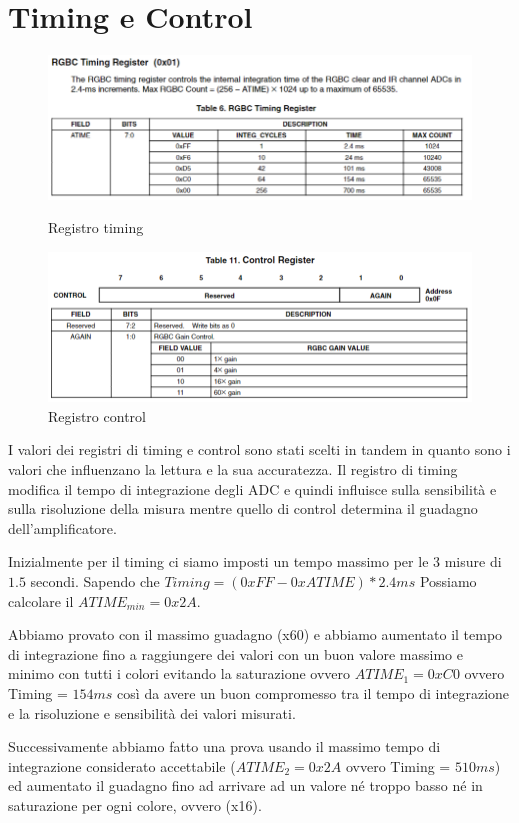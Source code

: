 \documentclass[12pt]{report}
\begin{document}
\section{Timing e Control}
\begin{figure} 
    \includegraphics[width=\textwidth]{Immagini_sensore/registro_timing.png}
    \caption{Registro timing}
    \includegraphics[width=\textwidth]{Immagini_sensore/registro_control.png}
    \caption{Registro control}
\end{figure}
    
I valori dei registri di timing e control sono stati scelti in tandem in quanto sono i valori che influenzano la lettura e la sua accuratezza. Il registro di timing modifica il tempo di integrazione degli ADC e quindi influisce sulla sensibilità e sulla risoluzione della misura mentre quello di control determina il guadagno dell'amplificatore.

Inizialmente per il timing ci siamo imposti un tempo massimo per le 3 misure di $1.5$ secondi. Sapendo che $Timing = (0xFF - 0xATIME) * 2.4ms$ Possiamo calcolare il \(ATIME_{min} = 0x2A\).

Abbiamo provato con il massimo guadagno (x60) e abbiamo aumentato il tempo di integrazione fino a raggiungere dei valori con un buon valore massimo e minimo con tutti i colori evitando la saturazione ovvero \(ATIME_{1} = 0xC0\) ovvero Timing = $154ms$ così da avere un buon compromesso tra il tempo di integrazione e la risoluzione e sensibilità dei valori misurati.

 Successivamente abbiamo fatto una prova usando il massimo tempo di integrazione considerato accettabile (\(ATIME_{2} = 0x2A\)  ovvero Timing = $510ms$) ed aumentato il guadagno fino ad arrivare ad un valore né troppo basso né in saturazione per ogni colore, ovvero (x16).
    
\end{document}
